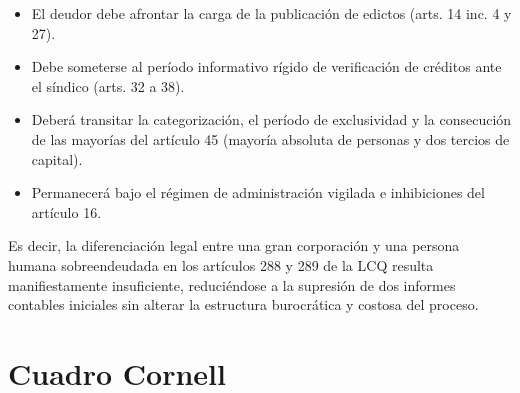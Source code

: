 \documentclass[12pt,oneside]{book}
\begin{document}
\begin{itemize}
    \item El deudor debe afrontar la carga de la publicación de edictos (arts. 14 inc. 4 y 27).
    \item Debe someterse al período informativo rígido de verificación de créditos ante el síndico (arts. 32 a 38).
    \item Deberá transitar la categorización, el período de exclusividad y la consecución de las mayorías del artículo 45 (mayoría absoluta de personas y dos tercios de capital).
    \item Permanecerá bajo el régimen de administración vigilada e inhibiciones del artículo 16.
\end{itemize}

Es decir, la diferenciación legal entre una gran corporación y una persona humana sobreendeudada en los artículos 288 y 289 de la LCQ resulta manifiestamente insuficiente, reduciéndose a la supresión de dos informes contables iniciales sin alterar la estructura burocrática y costosa del proceso.

\section{Cuadro Cornell}
\end{document}
